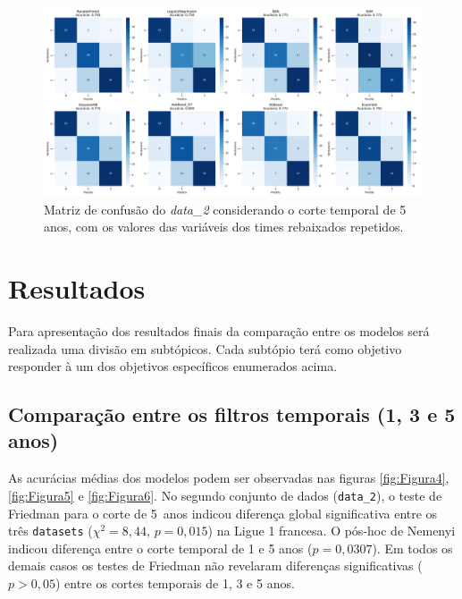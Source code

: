 \documentclass[a4paper]{article}
\theoremstyle{plain}
\theoremstyle{definition}
\begin{document}
\begin{figure}[H]
    \centering
    \includegraphics[width=1\textwidth]{Figures/data_2_5years_premier_league_matriz_confusao_repetido.png}
    \caption{Matriz de confusão do \textit{data\_2} considerando o corte temporal de 5 anos, com os valores das variáveis dos times rebaixados repetidos.}
    \label{fig:Figura3}
\end{figure}




\section{Resultados}
Para apresentação dos resultados finais da comparação entre os modelos será realizada uma divisão em subtópicos. Cada subtópio terá como objetivo responder à um dos objetivos específicos enumerados acima.

\subsection{Comparação entre os filtros temporais (1, 3 e 5 anos)}

As acurácias médias dos modelos podem ser observadas nas figuras \ref{fig:Figura4}, \ref{fig:Figura5} e \ref{fig:Figura6}. No segundo conjunto de dados (\texttt{data\_2}), o teste de Friedman para o corte de 5~anos indicou diferença global significativa entre os três \texttt{datasets} ($\chi^{2}=8{,}44$, $p=0{,}015$) na Ligue 1 francesa. O pós-hoc de Nemenyi indicou diferença entre o corte temporal de 1 e 5 anos ($p=0{,}0307$). Em todos os demais casos os testes de Friedman não revelaram diferenças significativas ($p>0{,}05$) entre os cortes temporais de 1, 3 e 5 anos.
\end{document}
